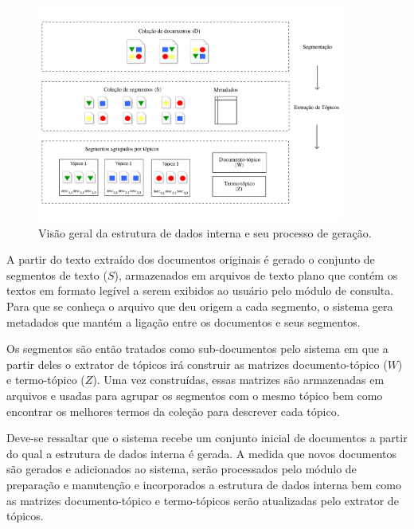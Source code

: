 


	\begin{figure}[h!]
\center
		\includegraphics[trim={ 0 40 0 40 },clip,page=1,width=0.9\textwidth]{conteudo/capitulos/figs/estrutura-de-dados-interna.pdf}

		\caption{Visão geral da estrutura de dados interna e seu processo de geração.}
		\label{fig:estrutura-dados-interna}
	\end{figure}




A partir do texto extraído dos documentos originais é gerado o conjunto de segmentos de texto ($S$), armazenados em arquivos de texto plano que contém os textos em formato legível a serem exibidos ao usuário pelo módulo de consulta. Para que se conheça o arquivo que deu origem a cada segmento, o sistema gera metadados que mantém a ligação entre os documentos e seus segmentos. 

Os segmentos são então tratados como sub-documentos pelo sistema em que a partir deles o extrator de tópicos irá construir as matrizes documento-tópico ($W$) e termo-tópico ($Z$). Uma vez construídas, essas matrizes são armazenadas em arquivos e usadas para agrupar os segmentos com o mesmo tópico bem como encontrar os melhores termos da coleção para descrever cada tópico.

Deve-se ressaltar que o sistema recebe um conjunto inicial de documentos a partir do qual a estrutura de dados interna é gerada. A medida que novos documentos são gerados e adicionados ao sistema, serão processados pelo módulo de preparação e manutenção e incorporados a estrutura de dados interna bem como as matrizes documento-tópico e termo-tópicos serão atualizadas pelo extrator de tópicos.




